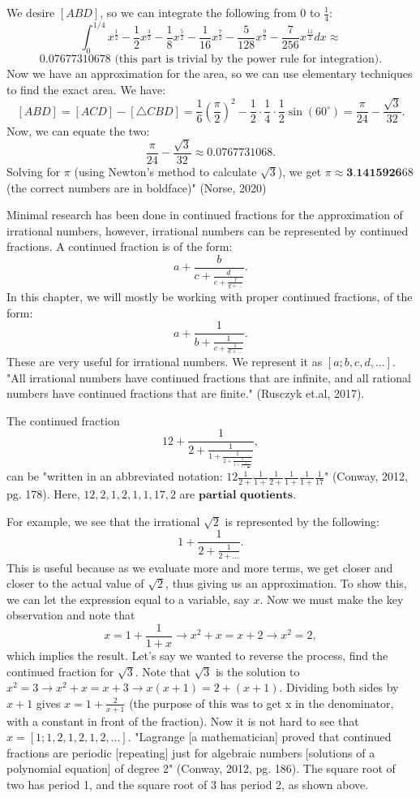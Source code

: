 \documentclass{article}
\begin{document}
We desire $[ABD]$, so we can integrate the following from $0$ to $\frac{1}{4}$:
$$\int_{0}^{1/4}x^{\frac{1}{2}}-\frac{1}{2}x^{\frac{3}{2}}-\frac{1}{8}x^{\frac{5}{2}}-\frac{1}{16}x^{\frac72}-\frac{5}{128}x^{\frac92}-\frac{7}{256}x^{\frac{11}{2}} dx\approx $$
$$0.07677310678\text{ (this part is trivial by the power rule for integration).}$$
Now we have an approximation for the area, so we can use elementary techniques to find the exact area. We have:
$$[ABD]=[ACD]-[\triangle CBD]=\frac{1}{6}\left(\frac{\pi}{2}\right)^2-\frac{1}{2}\cdot \frac14\cdot \frac12\sin(60^{\circ})=\frac{\pi}{24}-\frac{\sqrt{3}}{32}.$$
Now, we can equate the two: $$\frac{\pi}{24}-\frac{\sqrt3}{32}\approx 0.0767731068.$$ Solving for $\pi$ (using Newton's method to calculate $\sqrt{3}$), we get $\pi\approx \textbf{3.1415926}68$ (the correct numbers are in boldface)"
(Norse, 2020)
\par Minimal research has been done in continued fractions for the approximation of irrational numbers, however, irrational numbers can be represented by continued fractions. A continued fraction is of the form:
$$a+\frac{b}{c+\frac{d}{e+\frac{f}{g+...}}}.$$
In this chapter, we will mostly be working with proper continued fractions, of the form:
$$a+\frac{1}{b+\frac{1}{c+\frac{1}{d+...}}}.$$
These are very useful for irrational numbers. We represent it as $[a; b,c,d,...]$. "All irrational numbers have continued fractions that are infinite, and all rational numbers have continued fractions that are finite." (Rusczyk et.al, 2017). 
\par The continued fraction 
$$12+\frac{1}{2+\frac{1}{1+\frac{1}{2+\frac{1}{1+\frac{1}{1+\frac{1}{17}}}}}},$$
can be "written in an abbreviated notation: $12\frac{1}{2+}\frac{1}{1+}\frac{1}{2+}\frac{1}{1+}\frac{1}{1+}\frac{1}{17}$" (Conway, 2012, pg. 178). Here, $12,2,1,2,1,1,17,2$ are $\textbf{partial quotients}$.
\par For example, we see that the irrational $\sqrt2$ is represented by the following:
$$1+\frac{1}{2+\frac{1}{2+...}}.$$
This is useful because as we evaluate more and more terms, we get closer and closer to the actual value of $\sqrt{2}$, thus giving us an approximation. To show this, we can let the expression equal to a variable, say $x$. Now we must make the key observation and note that 
$$x=1+\frac{1}{1+x}\rightarrow x^2+x=x+2\rightarrow x^2=2,$$
which implies the result. Let's say we wanted to reverse the process, find the continued fraction for $\sqrt3$. Note that $\sqrt{3}$ is the solution to $x^2=3\rightarrow x^2+x=x+3\rightarrow x(x+1)=2+(x+1)$. Dividing both sides by $x+1$ gives $x=1+\frac{2}{x+1}$ (the purpose of this was to get x in the denominator, with a constant in front of the fraction). Now it is not hard to see that $x=[1;1,2,1,2,1,2,...]$. "Lagrange [a mathematician] proved that continued fractions are periodic [repeating] just for algebraic numbers [solutions of a polynomial equation] of degree 2" (Conway, 2012, pg. 186). The square root of two has period 1, and the square root of 3 has period 2, as shown above.
\end{document}
